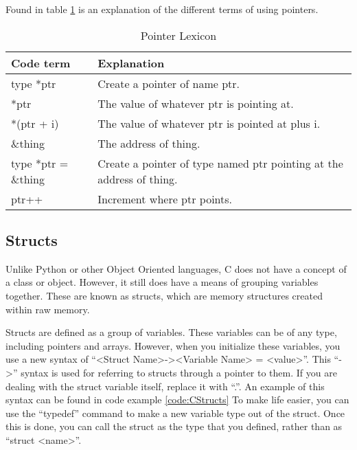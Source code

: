 			Found in table \ref{tab:PointerLexicon} is an explanation of the different terms of using pointers.

			\begin{table}[htb]
				\centering
				\begin{adjustbox}{max width=1\textwidth}
				\begin{tabular}{ l  p{8cm} }
					\toprule
					\textbf{Code term} & \textbf{Explanation} \\
					\toprule
					type *ptr & Create a pointer of name ptr. \\
					*ptr & The value of whatever ptr is pointing at. \\
					*(ptr + i) & The value of whatever ptr is pointed at plus i. \\
					\&thing & The address of thing. \\
					type *ptr = \&thing & Create a pointer of type named ptr pointing at the address of thing. \\
					ptr++ & Increment where ptr points. \\
					\bottomrule
				\end{tabular}
				\end{adjustbox}
				\caption{Pointer Lexicon}
				\label{tab:PointerLexicon}
			\end{table}
		\subsection{Structs}
			Unlike Python or other Object Oriented languages, C does not have a concept of a class or object.
			However, it still does have a means of grouping variables together.
			These are known as structs, which are memory structures created within raw memory.

			Structs are defined as a group of variables.
			These variables can be of any type, including pointers and arrays.
			However, when you initialize these variables, you use a new syntax of ``<Struct Name>-><Variable Name> = <value>''.
			This ``->'' syntax is used for referring to structs through a pointer to them.
			If you are dealing with the struct variable itself, replace it with ``.''.
			An example of this syntax can be found in code example \ref{code:CStructs}
			To make life easier, you can use the ``typedef'' command to make a new variable type out of the struct.
			Once this is done, you can call the struct as the type that you defined, rather than as ``struct <name>''.

